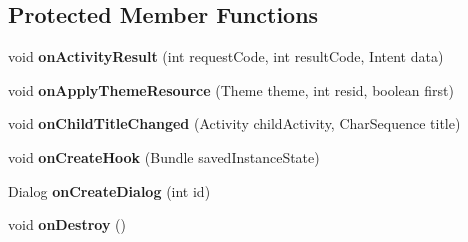 \subsection*{Protected Member Functions}
\begin{DoxyCompactItemize}
\item 
\mbox{\label{classorg_1_1qtproject_1_1qt5_1_1android_1_1bindings_1_1_qt_activity_a4e9a7c6b28384e4d5f713462207ffc41}} 
void {\bfseries on\+Activity\+Result} (int request\+Code, int result\+Code, Intent data)
\item 
\mbox{\label{classorg_1_1qtproject_1_1qt5_1_1android_1_1bindings_1_1_qt_activity_acd279279e5ad448d802fa31b64a30aef}} 
void {\bfseries on\+Apply\+Theme\+Resource} (Theme theme, int resid, boolean first)
\item 
\mbox{\label{classorg_1_1qtproject_1_1qt5_1_1android_1_1bindings_1_1_qt_activity_ac300f488c368a77573a3ecbf90f88b3c}} 
void {\bfseries on\+Child\+Title\+Changed} (Activity child\+Activity, Char\+Sequence title)
\item 
\mbox{\label{classorg_1_1qtproject_1_1qt5_1_1android_1_1bindings_1_1_qt_activity_a941c189550a7df876dfce52e7a09fe4e}} 
void {\bfseries on\+Create\+Hook} (Bundle saved\+Instance\+State)
\item 
\mbox{\label{classorg_1_1qtproject_1_1qt5_1_1android_1_1bindings_1_1_qt_activity_a94b7cad79823109fd5ce75385766144b}} 
Dialog {\bfseries on\+Create\+Dialog} (int id)
\item 
\mbox{\label{classorg_1_1qtproject_1_1qt5_1_1android_1_1bindings_1_1_qt_activity_a30832553da49ca0dea222e062e21710c}} 
void {\bfseries on\+Destroy} ()
\item 
\mbox{\label{classorg_1_1qtproject_1_1qt5_1_1android_1_1bindings_1_1_qt_activity_a995502b7cf803efcecc91d345b030404}} 

\end{DoxyCompactItemize}
